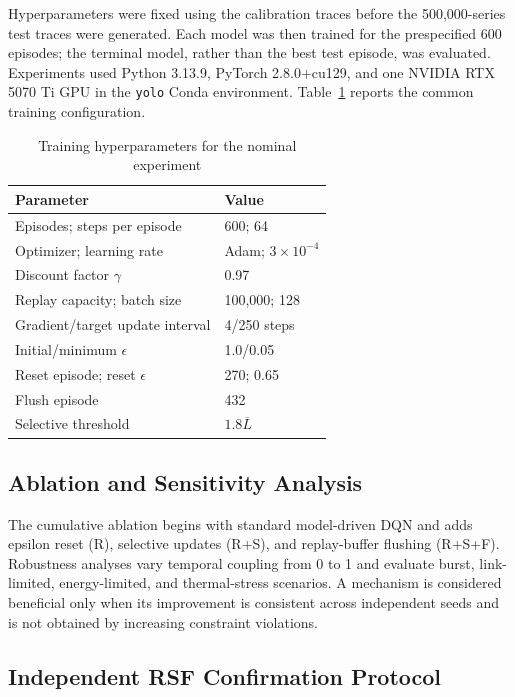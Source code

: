 \documentclass[lettersize,journal]{IEEEtran}
\begin{document}
Hyperparameters were fixed using the calibration traces before the 500,000-series test traces were generated. Each model was then trained for the prespecified 600 episodes; the terminal model, rather than the best test episode, was evaluated. Experiments used Python 3.13.9, PyTorch 2.8.0+cu129, and one NVIDIA RTX 5070 Ti GPU in the \texttt{yolo} Conda environment. Table~\ref{tab:dynamic_hyperparameters} reports the common training configuration.

\begin{table}[t]
\centering
\caption{Training hyperparameters for the nominal experiment}
\label{tab:dynamic_hyperparameters}
\begin{tabular}{ll}
\toprule
Parameter & Value \\
\midrule
Episodes; steps per episode & 600; 64 \\
Optimizer; learning rate & Adam; $3\times10^{-4}$ \\
Discount factor $\gamma$ & 0.97 \\
Replay capacity; batch size & 100,000; 128 \\
Gradient/target update interval & 4/250 steps \\
Initial/minimum $\epsilon$ & 1.0/0.05 \\
Reset episode; reset $\epsilon$ & 270; 0.65 \\
Flush episode & 432 \\
Selective threshold & $1.8\overline L$ \\
\bottomrule
\end{tabular}
\end{table}

\subsection{Ablation and Sensitivity Analysis}

The cumulative ablation begins with standard model-driven DQN and adds epsilon reset (R), selective updates (R+S), and replay-buffer flushing (R+S+F). Robustness analyses vary temporal coupling from 0 to 1 and evaluate burst, link-limited, energy-limited, and thermal-stress scenarios. A mechanism is considered beneficial only when its improvement is consistent across independent seeds and is not obtained by increasing constraint violations.

\subsection{Independent RSF Confirmation Protocol}
\label{sec:rsf_confirmation_protocol}
\end{document}
